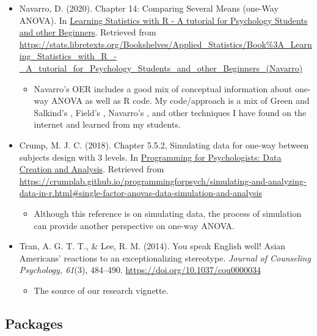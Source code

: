 \documentclass[
  11pt,
]{book}
\providecommand{\tightlist}{%
  \setlength{\itemsep}{0pt}\setlength{\parskip}{0pt}}
\begin{document}
\begin{itemize}
\tightlist
\item
  Navarro, D. (2020). Chapter 14: Comparing Several Means (one-Way ANOVA). In \href{https://learningstatisticswithr.com/}{Learning Statistics with R - A tutorial for Psychology Students and other Beginners}. Retrieved from \url{https://stats.libretexts.org/Bookshelves/Applied_Statistics/Book\%3A_Learning_Statistics_with_R_-_A_tutorial_for_Psychology_Students_and_other_Beginners_(Navarro)}

  \begin{itemize}
  \tightlist
  \item
    Navarro's OER includes a good mix of conceptual information about one-way ANOVA as well as R code. My code/approach is a mix of Green and Salkind's \citeyearpar{green_using_2014}, Field's \citeyearpar{field_discovering_2012}, Navarro's \citeyearpar{navarro_chapter_2020}, and other techniques I have found on the internet and learned from my students.
  \end{itemize}
\item
  Crump, M. J. C. (2018). Chapter 5.5.2, Simulating data for one-way between subjects design with 3 levels. In \href{https://crumplab.github.io/programmingforpsych/simulating-and-analyzing-data-in-r.html\#single-factor-anovas-data-simulation-and-analysis}{Programming for Psychologists: Data Creation and Analysis}. Retrieved from \url{https://crumplab.github.io/programmingforpsych/simulating-and-analyzing-data-in-r.html\#single-factor-anovas-data-simulation-and-analysis}

  \begin{itemize}
  \tightlist
  \item
    Although this reference is on simulating data, the process of simulation can provide another perspective on one-way ANOVA.
  \end{itemize}
\item
  Tran, A. G. T. T., \& Lee, R. M. (2014). You speak English well! Asian Americans' reactions to an exceptionalizing stereotype. \emph{Journal of Counseling Psychology, 61}(3), 484--490. \url{https://doi.org/10.1037/cou0000034}

  \begin{itemize}
  \tightlist
  \item
    The source of our research vignette.
  \end{itemize}
\end{itemize}

\hypertarget{packages-3}{%
\subsection{Packages}\label{packages-3}}
\end{document}
